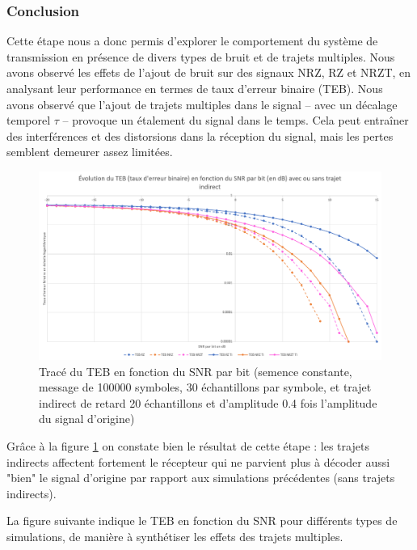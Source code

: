 \subsubsection{Conclusion}

Cette étape nous a donc permis d'explorer le comportement du système de transmission en présence de divers types de bruit et de trajets multiples. Nous avons observé les effets de l'ajout de bruit sur des signaux NRZ, RZ et NRZT, en analysant leur performance en termes de taux d'erreur binaire (TEB). Nous avons observé que l’ajout de trajets multiples dans le signal – avec un décalage temporel $\tau$ – provoque un étalement du signal dans le temps. Cela peut entraîner des interférences et des distorsions dans la réception du signal, mais les pertes semblent demeurer assez limitées.

\begin{figure}[H]
    \centering
    \includegraphics[width=\textwidth]{img/etape4b_teb_fct_snr_ti.png}
    \caption{Tracé du TEB en fonction du SNR par bit (semence constante, message de 100000 symboles, 30 échantillons par symbole, et trajet indirect de retard 20 échantillons et d'amplitude 0.4 fois l'amplitude du signal d'origine)}
    \label{fig:etape4b_teb_fct_snr_ti}
\end{figure}


Grâce à la figure \ref{fig:etape4b_teb_fct_snr_ti} on constate bien le résultat de cette étape : les trajets indirects affectent fortement le récepteur qui ne parvient plus à décoder aussi "bien" le signal d'origine par rapport aux simulations précédentes (sans trajets indirects).

La figure suivante indique le TEB en fonction du SNR pour différents types de simulations, de manière à synthétiser les effets des trajets multiples.

